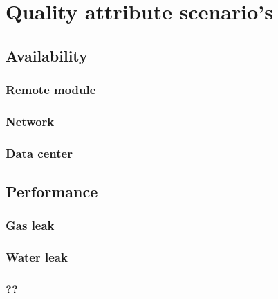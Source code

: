 \chapter{Quality attribute scenario's}
\label{quality-attribute-scenarios}

\section{Availability}

\subsection{Remote module}
\label{qas-av-module}


\subsection{Network}
\label{qas-av-network}


\subsection{Data center}
\label{qas-av-datacenter}


\section{Performance}

\subsection{Gas leak}
\label{qas-perf-gas}


\subsection{Water leak}
\label{qas-perf-water}


\subsection{??}
\label{qas-perf-other}
